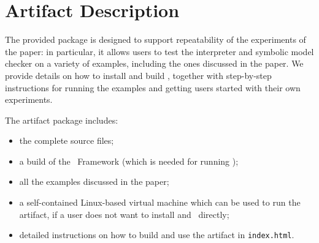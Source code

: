 
\clearpage\appendix\section{Artifact Description}



\begin{summary}
  The provided package is designed to support repeatability of the experiments of the paper: 
  in particular, it allows users to test the \kphp{} interpreter and symbolic model checker on a variety of 
  examples, including the ones discussed in the paper. 
  We provide details on how to install and build \kphp{}, together with step-by-step instructions for running the examples and getting users started with their own experiments.
\end{summary}

\begin{content}
  The artifact package includes:
  \begin{itemize}
  \item the complete source files;
  \item a build of the \K\ Framework (which is needed for running \kphp{});
  \item all the examples discussed in the paper;
  \item a self-contained Linux-based virtual machine which can be used to run the artifact, if a user does not want to install \kphp{} and \K\ directly;
  \item detailed instructions on how to build and use the artifact in {\tt index.html}.
  \end{itemize}
\end{content} 

